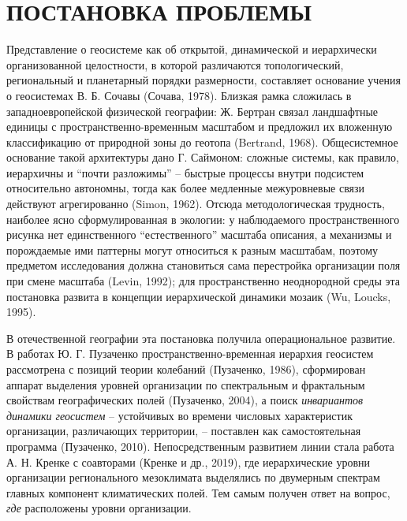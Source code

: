 \documentclass[12pt,a4paper]{article}
\begin{document}
\section{ПОСТАНОВКА ПРОБЛЕМЫ}

Представление о геосистеме как об открытой, динамической и иерархически организованной целостности, в которой различаются топологический, региональный и планетарный порядки размерности, составляет основание учения о геосистемах В. Б. Сочавы (Сочава, 1978). Близкая рамка сложилась в западноевропейской физической географии: Ж. Бертран связал ландшафтные единицы с пространственно-временным масштабом и предложил их вложенную классификацию от природной зоны до геотопа (Bertrand, 1968). Общесистемное основание такой архитектуры дано Г. Саймоном: сложные системы, как правило, иерархичны и “почти разложимы” -- быстрые процессы внутри подсистем относительно автономны, тогда как более медленные межуровневые связи действуют агрегированно (Simon, 1962). Отсюда методологическая трудность, наиболее ясно сформулированная в экологии: у наблюдаемого пространственного рисунка нет единственного “естественного” масштаба описания, а механизмы и порождаемые ими паттерны могут относиться к разным масштабам, поэтому предметом исследования должна становиться сама перестройка организации поля при смене масштаба (Levin, 1992); для пространственно неоднородной среды эта постановка развита в концепции иерархической динамики мозаик (Wu, Loucks, 1995).

В отечественной географии эта постановка получила операциональное развитие. В работах Ю. Г. Пузаченко пространственно-временная иерархия геосистем рассмотрена с позиций теории колебаний (Пузаченко, 1986), сформирован аппарат выделения уровней организации по спектральным и фрактальным свойствам географических полей (Пузаченко, 2004), а поиск \emph{инвариантов динамики геосистем} -- устойчивых во времени числовых характеристик организации, различающих территории, -- поставлен как самостоятельная программа (Пузаченко, 2010). Непосредственным развитием линии стала работа А. Н. Кренке с соавторами (Кренке и др., 2019), где иерархические уровни организации регионального мезоклимата выделялись по двумерным спектрам главных компонент климатических полей. Тем самым получен ответ на вопрос, \emph{где} расположены уровни организации.
\end{document}
